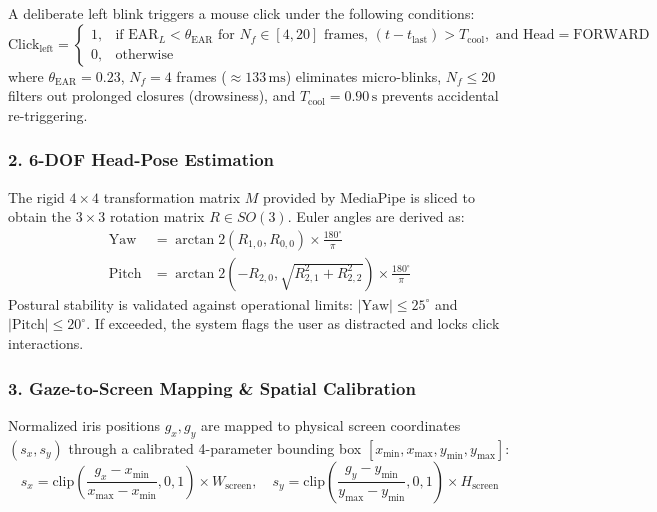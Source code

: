 \documentclass[11pt,a4paper]{article}
\begin{document}
A deliberate left blink triggers a mouse click under the following conditions:
\begin{equation}
\text{Click}_{\text{left}} = 
\begin{cases}
1, & \text{if } \text{EAR}_L < \theta_{\text{EAR}} \text{ for } N_f \in [4, 20] \text{ frames, } (t - t_{\text{last}}) > T_{\text{cool}}, \text{ and } \text{Head} = \text{FORWARD} \\
0, & \text{otherwise}
\end{cases}
\end{equation}
where $\theta_{\text{EAR}} = 0.23$, $N_f = 4$ frames ($\approx 133\,\text{ms}$) eliminates micro-blinks, $N_f \le 20$ filters out prolonged closures (drowsiness), and $T_{\text{cool}} = 0.90\,\text{s}$ prevents accidental re-triggering.

\subsubsection{2. 6-DOF Head-Pose Estimation}
The rigid $4 \times 4$ transformation matrix $M$ provided by MediaPipe is sliced to obtain the $3 \times 3$ rotation matrix $R \in SO(3)$. Euler angles are derived as:
\begin{align}
\text{Yaw}   &= \arctan2\left(R_{1,0}, R_{0,0}\right) \times \frac{180^\circ}{\pi} \\
\text{Pitch} &= \arctan2\left(-R_{2,0}, \sqrt{R_{2,1}^2 + R_{2,2}^2}\right) \times \frac{180^\circ}{\pi}
\end{align}
Postural stability is validated against operational limits: $|\text{Yaw}| \le 25^\circ$ and $|\text{Pitch}| \le 20^\circ$. If exceeded, the system flags the user as distracted and locks click interactions.

\subsubsection{3. Gaze-to-Screen Mapping \& Spatial Calibration}
Normalized iris positions $g_x, g_y$ are mapped to physical screen coordinates $(s_x, s_y)$ through a calibrated 4-parameter bounding box $[x_{\min}, x_{\max}, y_{\min}, y_{\max}]$:
\begin{equation}
s_x = \text{clip}\left(\frac{g_x - x_{\min}}{x_{\max} - x_{\min}}, 0, 1\right) \times W_{\text{screen}}, \quad
s_y = \text{clip}\left(\frac{g_y - y_{\min}}{y_{\max} - y_{\min}}, 0, 1\right) \times H_{\text{screen}}
\end{equation}
\end{document}
